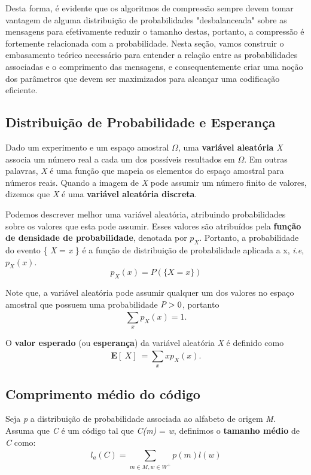 Desta forma, é evidente que os algoritmos de compressão sempre devem tomar vantagem de alguma distribuição de probabilidades "desbalanceada" sobre as mensagens para efetivamente reduzir o tamanho destas, portanto, a compressão é fortemente relacionada com a probabilidade. Nesta seção, vamos construir o embasamento teórico necessário para entender a relação entre as probabilidades associadas e o comprimento das mensagens, e consequentemente criar uma noção dos parâmetros que devem ser maximizados para alcançar uma codificação eficiente.

\subsection{Distribuição de Probabilidade e Esperança}
Dado um experimento e um espaço amostral $\Omega$, uma \textbf{variável aleatória} \emph{X} associa um número real a cada um dos possíveis resultados em $\Omega$. Em outras palavras, \emph{X} é uma função que mapeia os elementos do espaço amostral para números reais. Quando a imagem de \emph{X} pode assumir um número finito de valores, dizemos que \emph{X} é uma \textbf{variável aleatória discreta}.

Podemos descrever melhor uma variável aleatória, atribuindo probabilidades sobre os valores que esta pode assumir. Esses valores são atribuídos pela \textbf{função de densidade de probabilidade}, denotada por \emph{$p_X$}. Portanto, a probabilidade do evento \{ \emph{X} = \emph{x} \} é a função de distribuição de probabilidade aplicada a x, \emph{i.e}, \emph{$p_X(x)$}.
\begin{equation*}
p_X(x) = P(\{X = x\})
\end{equation*}

Note que, a variável aleatória pode assumir qualquer um dos valores no espaço amostral que possuem uma probabilidade $\emph{P} > 0$, portanto
\begin{equation*}
\sum_{x}^{}p_X(x) = 1.
\end{equation*}

O \textbf{valor esperado} (ou \textbf{esperança}) da variável aleatória \emph{X} é definido como
\begin{equation*}
\textbf{E}[\ X]\ = \sum_{x}^{} xp_X(x).
\end{equation*}

\subsection{Comprimento médio do código}
Seja \emph{p} a distribuição de probabilidade associada ao alfabeto de origem \emph{M}. Assuma que \emph{C} é um código tal que \emph{C(m)} = \emph{w}, definimos o \textbf{tamanho médio} de \emph{C} como:
\begin{equation*}
l_a (C) = \sum_{m \in M, w \in W^+}^{} p(m) l(w)
\end{equation*}

